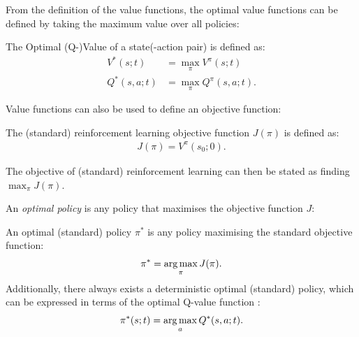     From the definition of the value functions, the optimal value functions can be defined by taking the maximum value over all policies:
    \begin{defn}
        \label{def:2:optimal_value}
        \label{def:2:optimal_q_value}
        The \textnormal{Optimal (Q-)Value} of a state(-action pair) is defined as:
        \begin{align}
            V^*(s;t) &= \max_{\pi} V^{\pi}(s;t) \label{eq:2:opt_value_fn_def} \\
            Q^*(s,a;t) &= \max_{\pi} Q^{\pi}(s,a;t). \label{eq:2:opt_q_value_fn_def}
        \end{align}
    \end{defn}

    Value functions can also be used to define an objective function:
    \begin{defn}
        \label{def:2:rl_obj_fn}
        The \textnormal{(standard) reinforcement learning objective function} $J(\pi)$ is defined as:
        \begin{align}
            J(\pi) = V^{\pi}(s_0;0). \label{eq:2:rl_obj_fn_def}
        \end{align}

        The objective of (standard) reinforcement learning can then be stated as finding $\max_{\pi} J(\pi)$.
    \end{defn}

    An \textit{optimal policy} is any policy that maximises the objective function $J$:
    \begin{defn}
        \label{def:2:opt_policy}
        An \textnormal{optimal (standard) policy} $\pi^*$ is any policy maximising the standard objective function:
        \begin{align}
            \pi^* = \operatorname*{arg\,max}_\pi J(\pi). \label{eq:2:opt_policy_def}
        \end{align}
        Additionally, there always exists a deterministic optimal (standard) policy, which can be expressed in terms of the optimal Q-value function \cite{kolobov}:
        \begin{align}
            \pi^*(s;t) = \operatorname*{arg\,max}_a Q^*(s,a;t). \label{eq:2:opt_policy_from_opt_q_value}
        \end{align}
    \end{defn}

